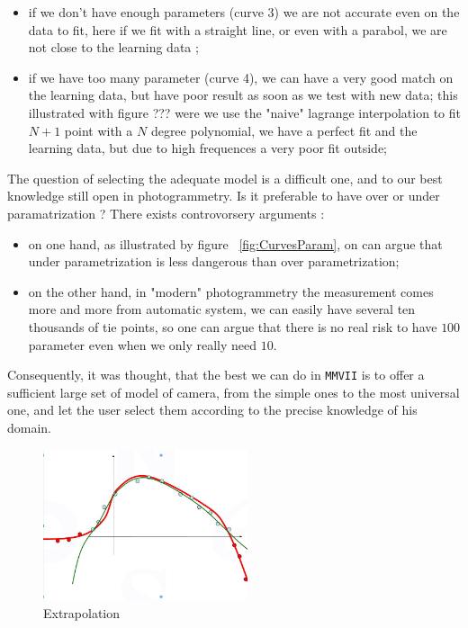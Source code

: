 \begin{itemize}
	\item if we don't have enough parameters (curve 3) we are not accurate  even on the data to fit,
	   here if we fit with a straight line, or even with a parabol, we are not close to the learning data ;

   \item if we  have too many parameter (curve 4), we can have a very good match on the learning data, but have 
	 poor result as soon as we test with new data; this illustrated with  figure ??? were
         we use the "naive" lagrange interpolation to fit $N+1$ point with a $N$ degree polynomial,
         we have a perfect fit and the learning data, but due to high frequences a very poor fit outside;
\end{itemize}

The question of selecting the adequate model is a difficult one, and to our best knowledge
still open in photogrammetry.  Is it preferable to have over or under paramatrization ? There
exists controvorsery arguments :


\begin{itemize}
   \item  on one hand, as illustrated by figure ~\ref{fig:CurvesParam}, on can argue that under parametrization is less dangerous
         than over parametrization;

   \item  on the other hand, in "modern" photogrammetry the measurement comes more and more from automatic system,
          we can easily have several ten thousands of tie points, so one can argue that there is no real risk to have $100$ parameter
          even when we only really need $10$.
\end{itemize}

Consequently, it was thought, that the best we can do in {\tt MMVII} is to offer a sufficient large set of model
of camera, from the simple ones to the most universal one, and let the user select them according to
the precise knowledge of his domain. 

\begin{figure}
\centering
	\includegraphics[width=6cm]{Methods/Images/CourbeExrapol.jpg}
	\caption{Extrapolation}
	\label{fig:CurvesExtrpol}
\end{figure}

